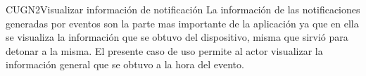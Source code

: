 
\begin{UseCase}{CUGN2}{Visualizar información de notificación}
    {
	  	La información de las notificaciones generadas por eventos son la parte mas importante de la aplicación ya que en ella se visualiza la información que se obtuvo del dispositivo, misma que sirvió para detonar a la misma. El presente caso de uso permite al actor visualizar la información general que se obtuvo a la hora del evento.
    }

\end{UseCase}
